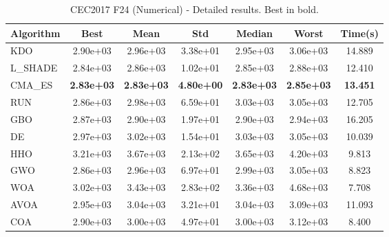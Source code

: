\begin{table}[H]
\centering\small
\caption{CEC2017 F24 (Numerical) - Detailed results. Best in bold.}
\label{tab:cec2017_F24}
\begin{tabular}{lcccccc}
\toprule
\textbf{Algorithm} & \textbf{Best} & \textbf{Mean} & \textbf{Std} & \textbf{Median} & \textbf{Worst} & \textbf{Time(s)} \\
\midrule
KDO & 2.90e+03 & 2.96e+03 & 3.38e+01 & 2.95e+03 & 3.06e+03 & 14.889 \\
L_SHADE & 2.84e+03 & 2.86e+03 & 1.02e+01 & 2.85e+03 & 2.88e+03 & 12.410 \\
CMA_ES & \textbf{2.83e+03} & \textbf{2.83e+03} & \textbf{4.80e+00} & \textbf{2.83e+03} & \textbf{2.85e+03} & \textbf{13.451} \\
RUN & 2.86e+03 & 2.98e+03 & 6.59e+01 & 3.03e+03 & 3.05e+03 & 12.705 \\
GBO & 2.87e+03 & 2.90e+03 & 1.97e+01 & 2.90e+03 & 2.94e+03 & 16.205 \\
DE & 2.97e+03 & 3.02e+03 & 1.54e+01 & 3.03e+03 & 3.05e+03 & 10.039 \\
HHO & 3.21e+03 & 3.67e+03 & 2.13e+02 & 3.65e+03 & 4.20e+03 & 9.813 \\
GWO & 2.86e+03 & 2.96e+03 & 6.97e+01 & 2.99e+03 & 3.05e+03 & 8.823 \\
WOA & 3.02e+03 & 3.43e+03 & 2.83e+02 & 3.36e+03 & 4.68e+03 & 7.708 \\
AVOA & 2.95e+03 & 3.04e+03 & 3.21e+01 & 3.04e+03 & 3.09e+03 & 11.093 \\
COA & 2.90e+03 & 3.00e+03 & 4.97e+01 & 3.00e+03 & 3.12e+03 & 8.400 \\
\bottomrule
\end{tabular}
\end{table}

